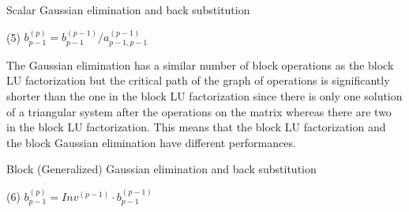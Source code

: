 \begin{algorithm}[h]
	\DontPrintSemicolon
	\caption{Scalar Gaussian elimination and back substitution \label{alg:bg_el_scalar}}

	(5) $b_{p-1}^{(p)} = b_{p-1}^{(p-1)} / a_{p-1,p-1}^{(p-1)} $ \;

\end{algorithm}

The Gaussian elimination has a similar number of block operations as the block LU factorization but the critical path of the graph of operations is significantly shorter than the one in the block LU factorization since there is only one solution of a triangular system after the operations on the matrix whereas there are two in the block LU factorization.
This means that the block LU factorization and the block Gaussian elimination have different performances.

\begin{algorithm}[h]
	\DontPrintSemicolon
	\caption{Block (Generalized) Gaussian elimination and back substitution \label{alg:bg_el_block}}

	(6) $b_{p-1}^{(p)} = Inv^{(p-1)} \cdot b_{p-1}^{(p-1)}$ \;

\end{algorithm}



